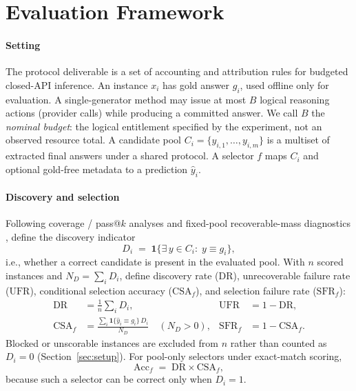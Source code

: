 \section{Evaluation Framework}
\label{sec:problem}

\paragraph{Setting} The protocol deliverable is a set of accounting and attribution rules for
budgeted closed-API inference. An instance $x_i$ has gold answer $g_i$, used offline only for
evaluation. A single-generator method may issue at most $B$ logical reasoning actions (provider
calls) while producing a committed answer. We call $B$ the \emph{nominal budget}: the logical
entitlement specified by the experiment, not an observed resource total. A candidate pool
$C_i=\{y_{i,1},\ldots,y_{i,m}\}$ is a multiset of extracted final answers under a shared protocol. A
selector $f$ maps $C_i$ and optional gold-free metadata to a prediction $\hat y_i$.

\paragraph{Discovery and selection}
Following coverage / pass@$k$ analyses \citep{passatk,ll_monkeys} and fixed-pool recoverable-mass
diagnostics \citep{oracle_gap}, define the discovery indicator
\begin{equation}
\label{eq:Di}
D_i \;=\; \mathbf{1}\{\exists\, y\in C_i:\; y\equiv g_i\},
\end{equation}
i.e., whether a correct candidate is present in the evaluated pool. With $n$ scored instances and
$N_D=\sum_i D_i$, define discovery rate ($\mathrm{DR}$), unrecoverable failure rate ($\mathrm{UFR}$),
conditional selection accuracy ($\mathrm{CSA}_f$), and selection failure rate ($\mathrm{SFR}_f$):
\begin{equation}
\label{eq:rates}
\begin{aligned}
\mathrm{DR} &= \tfrac1n\sum_i D_i, &
\mathrm{UFR} &= 1-\mathrm{DR}, \\
\mathrm{CSA}_f &= \frac{\sum_i \mathbf{1}\{\hat y_i\equiv g_i\}\,D_i}{N_D}
\quad (N_D>0), &
\mathrm{SFR}_f &= 1-\mathrm{CSA}_f.
\end{aligned}
\end{equation}
Blocked or unscorable instances are excluded from $n$ rather than counted as $D_i=0$
(Section~\ref{sec:setup}). For pool-only selectors under exact-match scoring,
\begin{equation}
\label{eq:acc-decomp}
\mathrm{Acc}_f \;=\; \mathrm{DR}\times\mathrm{CSA}_f,
\end{equation}
because such a selector can be correct only when $D_i=1$.

